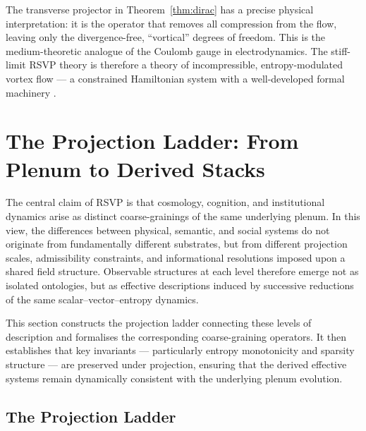 \documentclass[12pt, a4paper]{article}
\theoremstyle{plain}
\theoremstyle{definition}
\theoremstyle{remark}
\begin{document}
The transverse projector in Theorem~\ref{thm:dirac} has a precise physical interpretation:
it is the operator that removes all compression from the flow, leaving only the
divergence-free, ``vortical'' degrees of freedom.  This is the medium-theoretic analogue
of the Coulomb gauge in electrodynamics.  The stiff-limit RSVP theory is therefore
a theory of incompressible, entropy-modulated vortex flow --- a constrained Hamiltonian
system with a well-developed formal machinery \cite{Nicolis2013, Endlich2013}.

\section{The Projection Ladder: From Plenum to Derived Stacks}
\label{sec:stack}

The central claim of RSVP is that cosmology, cognition, and institutional dynamics arise as distinct coarse-grainings of the same underlying plenum. In this view, the differences between physical, semantic, and social systems do not originate from fundamentally different substrates, but from different projection scales, admissibility constraints, and informational resolutions imposed upon a shared field structure. Observable structures at each level therefore emerge not as isolated ontologies, but as effective descriptions induced by successive reductions of the same scalar--vector--entropy dynamics.

This section constructs the projection ladder connecting these levels of description and formalises the corresponding coarse-graining operators. It then establishes that key invariants --- particularly entropy monotonicity and sparsity structure --- are preserved under projection, ensuring that the derived effective systems remain dynamically consistent with the underlying plenum evolution.

\subsection{The Projection Ladder}
\end{document}
